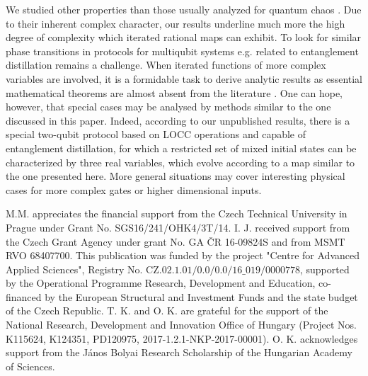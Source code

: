 \documentclass[%
 aip,
 amsmath,amssymb,
 reprint,%
]{revtex4-1}
\begin{document}
We studied other properties than those usually analyzed for quantum chaos \cite{Haake}. Due to their inherent complex character, our results underline much more the high degree of complexity which iterated rational maps can exhibit. 
To look for similar phase transitions in protocols for multiqubit systems e.g. related to entanglement distillation remains a challenge. When iterated functions of more complex variables are involved, it is a formidable task to derive analytic results as essential mathematical theorems are almost absent from the literature \cite{Fornaess}. One can hope, however, that special cases may be analysed by methods similar to the one discussed in this paper. Indeed, according to our unpublished results, there is a special two-qubit protocol based on LOCC operations and capable of entanglement distillation, for which a restricted set of mixed initial states can be characterized by three real variables, which evolve according to a map similar to the one presented here.
More general situations may cover interesting physical cases for more complex gates or higher dimensional inputs.

\begin{acknowledgments}

M.M. appreciates the financial support from the Czech Technical University in Prague under Grant No. SGS16/241/OHK4/3T/14. I. J. received support from the Czech Grant Agency under grant No. GA \v CR 16-09824S and from MSMT RVO 68407700. This publication was funded by the project "Centre for Advanced Applied Sciences", Registry No. CZ.$02.1.01/0.0/0.0/16\_019/0000778$, supported by the Operational Programme Research, Development and Education, co-financed by the European Structural and Investment Funds and the state budget of the Czech Republic. T. K. and O. K. are grateful for the support of the National Research, Development and Innovation Office of Hungary (Project Nos. K115624, K124351, PD120975, 2017-1.2.1-NKP-2017-00001). O. K. acknowledges support from the J\'{a}nos Bolyai Research Scholarship of the Hungarian Academy of Sciences.

\end{acknowledgments}
\end{document}
